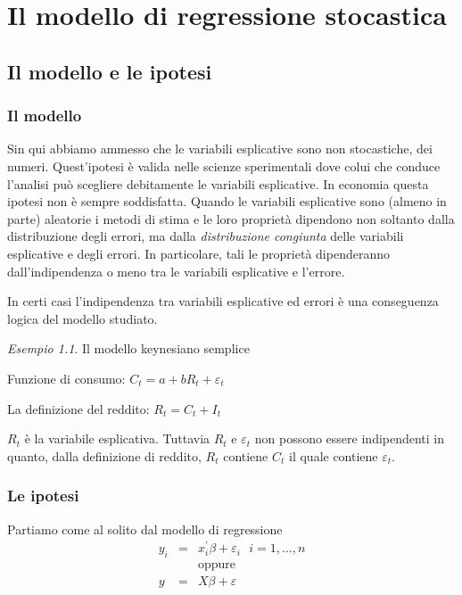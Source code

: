 \documentclass[a4paper]{report}
\newcounter{ese}
\newcounter{def}
\theoremstyle{remark}
\newtheorem{esempio}[ese]{Esempio}
\newcounter{theor}
\begin{document}
\chapter{Il modello di regressione stocastica}

\section{Il modello e le ipotesi}

\subsection{Il modello}

Sin qui abbiamo ammesso che le variabili esplicative sono non stocastiche,
dei numeri. Quest'ipotesi \`{e} valida nelle scienze sperimentali dove colui
che conduce l'analisi pu\`{o} scegliere debitamente le variabili
esplicative. In economia questa ipotesi non \`{e} sempre soddisfatta. Quando
le variabili esplicative sono (almeno in parte) aleatorie i metodi di stima
e le loro propriet\`{a} dipendono non soltanto dalla distribuzione degli
errori, ma dalla \emph{distribuzione congiunta} delle variabili esplicative
e degli errori. In particolare, tali le propriet\`{a} dipenderanno
dall'indipendenza o meno tra le variabili esplicative e l'errore.

\noindent In certi casi l'indipendenza tra variabili esplicative ed errori 
\`{e} una conseguenza logica del modello studiato.

\begin{esempio}
Il modello keynesiano semplice

Funzione di consumo: $C_{t}=a+bR_{t}+\varepsilon _{t}$

La definizione del reddito: $R_{t}=C_{t}+I_{t}$

$R_{t}$ \`{e} la variabile esplicativa. Tuttavia $R_{t}$ e $\varepsilon _{t}$
non possono essere indipendenti in quanto, dalla definizione di reddito, $%
R_{t}$ contiene $C_{t}$ il quale contiene $\varepsilon _{t}$.
\end{esempio}

\subsection{Le ipotesi}

Partiamo come al solito dal modello di regressione%
\begin{eqnarray*}
y_{i} &=&x_{i}^{\prime }\beta +\varepsilon _{i}\text{ \ \ }i=1,...,n \\
&&\text{oppure} \\
y &=&X\beta +\varepsilon
\end{eqnarray*}
\end{document}

